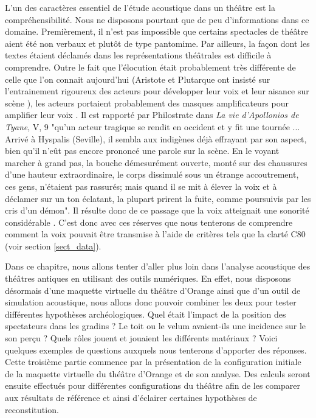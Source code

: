 L'un des caractères essentiel de l'étude acoustique dans un théâtre est la compréhensibilité. Nous ne disposons pourtant que de peu d'informations dans ce domaine. Premièrement, il n'est pas impossible que certains spectacles de théâtre aient été non verbaux et plutôt de type pantomime. Par ailleurs, la façon dont les textes étaient déclamés dans les représentations théâtrales est difficile à comprendre. Outre le fait que l'élocution était probablement très différente de celle que l'on connait aujourd'hui (Aristote \cite[Chap IV - XIV]{aristote} et Plutarque ont insisté sur l'entrainement rigoureux des acteurs pour développer leur voix et leur aisance sur scène \cite[p.39]{canac}), les acteurs portaient probablement des masques amplificateurs pour amplifier leur voix \cite[p.362]{arnaud}. Il est rapporté par Philostrate dans \textit{La vie d'Apollonios de Tyane}, V, 9 "qu'un acteur tragique se rendit en occident et y fit une tournée ... Arrivé à Hyspalis (Seville), il sembla aux indigènes déjà effrayant par son aspect, bien qu'il n'eût pas encore prononcé une parole sur la scène. En le voyant marcher à grand pas, la bouche démesurément ouverte, monté sur des chaussures d'une hauteur extraordinaire, le corps dissimulé sous un étrange accoutrement, ces gens, n'étaient pas rassurés; mais quand il se mit à élever la voix et à déclamer sur un ton éclatant, la plupart prirent la fuite, comme poursuivis par les cris d'un démon". Il résulte donc de ce passage que la voix atteignait une sonorité considérable \cite[p.43]{formige}. C'est donc avec ces réserves que nous tenterons de comprendre comment la voix pouvait être transmise à l'aide de critères tels que la clarté \gls{C80} (voir section \ref{sect_data}).

Dans ce chapitre, nous allons tenter d'aller plus loin dans l'analyse acoustique des théâtres antiques en utilisant des outils numériques. En effet, nous disposons désormais d'une maquette virtuelle du théâtre d'Orange ainsi que d'un outil de simulation acoustique, nous allons donc pouvoir combiner les deux pour tester différentes hypothèses archéologiques. Quel était l'impact de la position des spectateurs dans les gradins ? Le toit ou le \gls{velum} avaient-ils une incidence sur le son perçu ? Quels rôles jouent et jouaient les différents matériaux ? Voici quelques exemples de questions auxquels nous tenterons d'apporter des réponses. Cette troisième partie commence par la présentation de la configuration initiale de la maquette virtuelle du théâtre d'Orange et de son analyse. Des calculs seront ensuite effectués pour différentes configurations du théâtre afin de les comparer aux résultats de référence et ainsi d'éclairer certaines hypothèses de reconstitution. %
	

